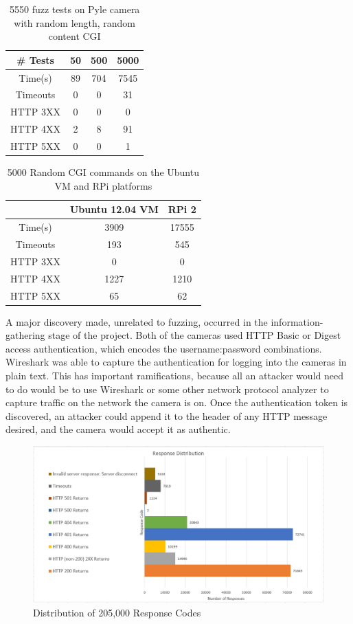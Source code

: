 \documentclass[letterpaper,twocolumn,10pt]{article}
\begin{document}
\begin{table}[h]
\centering
	\begin{tabular}{ |c|c|c|c| }
		\hline
		\# Tests & 50 & 500 & 5000 \\
		\hline
		\hline
		Time(s) & 89 & 704 & 7545 \\
		Timeouts & 0 & 0 & 31  \\
		HTTP 3XX & 0 & 0 & 0 \\
		HTTP 4XX & 2 & 8 & 91 \\
		HTTP 5XX & 0 & 0 & 1 \\
		\hline
	\end{tabular}
	\caption{5550 fuzz tests on Pyle camera with random length, random content CGI}
	\label{tab:Pyle_Rand_CGI} 
\end{table}

\begin{table}[h]
\centering
	\begin{tabular}{ |c|c|c| }
		\hline
		~ & Ubuntu 12.04 VM & RPi 2\\
		\hline
		\hline
		Time(s) & 3909 & 17555 \\
		Timeouts & 193 & 545  \\
		HTTP 3XX & 0 & 0 \\
		HTTP 4XX & 1227 & 1210 \\
		HTTP 5XX & 65 & 62 \\
		\hline
	\end{tabular}
	\caption{5000 Random CGI commands on the Ubuntu VM and RPi platforms}
	\label{tab:VMvsPi} 
\end{table}

A major discovery made, unrelated to fuzzing, occurred in the information-gathering stage of the project. Both of the cameras used HTTP Basic or Digest access authentication, which encodes the username:password combinations. Wireshark was able to capture the authentication for logging into the cameras in plain text. This has important ramifications, because all an attacker would need to do would be to use Wireshark or some other network protocol analyzer to capture traffic on the network the camera is on. Once the authentication token is discovered, an attacker could append it to the header of any HTTP message desired, and the camera would accept it as authentic. 

\begin{figure}[h b]
\centering
\includegraphics[width=1.9\linewidth]{dist}
\caption{Distribution of 205,000 Response Codes}
\label{fig:dist}
\end{figure}
\end{document}
